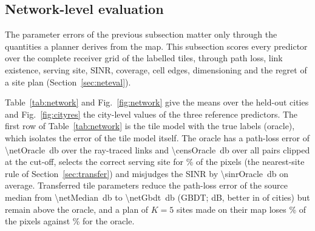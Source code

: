 \subsection{Network-level evaluation}
\label{sec:res-network}

The parameter errors of the previous subsection matter only through the
quantities a planner derives from the map. This subsection scores every
predictor over the complete receiver grid of the labelled tiles, through
path loss, link existence, serving site, SINR, coverage, cell edges,
dimensioning and the regret of a site plan (Section~\ref{sec:neteval}).

Table~\ref{tab:network} and Fig.~\ref{fig:network} give the means over the
held-out cities and Fig.~\ref{fig:cityres} the city-level values of the
three reference predictors. The first row of Table~\ref{tab:network} is the
tile model with the true labels (oracle), which isolates the error of the
tile model itself. The oracle has a path-loss error of
\SI{\netOracle}{\decibel} over the ray-traced links and
\SI{\censOracle}{\decibel} over all pairs clipped at the cut-off, selects
the correct serving site for \assocOracle\% of the pixels (the nearest-site
rule of Section~\ref{sec:transfer}) and misjudges the SINR by
\SI{\sinrOracle}{\decibel} on average. Transferred tile parameters reduce
the path-loss error of the source median from \SI{\netMedian}{\decibel} to
\SI{\netGbdt}{\decibel} (GBDT; \dNetGbdtMedian{} dB, better in
\nNetGbdtMedian{} of \nFolds{} cities) but remain above the oracle, and a
plan of $K=5$ sites made on their map loses \regretGbdt\% of the pixels
against \regretOracle\% for the oracle.

